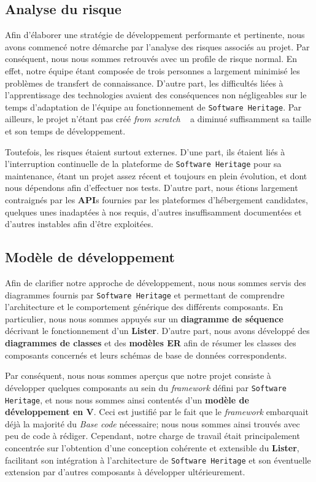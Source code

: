 \documentclass[12pt,a4paper]{report}
\begin{document}
\subsection{Analyse du risque}
Afin d'élaborer une stratégie de développement performante et pertinente, nous avons commencé notre démarche par l'analyse des risques associés au projet. Par conséquent, nous nous sommes retrouvés avec un profile de risque normal. En effet, notre équipe étant composée de trois personnes a largement minimisé les problèmes de transfert de connaissance. D'autre part, les difficultés liées à l'apprentissage des technologies avaient des conséquences non négligeables sur le temps d'adaptation de l'équipe au fonctionnement de \texttt{Software Heritage}.
Par ailleurs, le projet n'étant pas créé \og \textit{from scratch} \fg~ a diminué suffisamment sa taille et son temps de développement.

Toutefois, les risques étaient surtout externes. D'une part, ils étaient liés à l'interruption continuelle de la plateforme de \texttt{Software Heritage} pour sa maintenance, étant un projet assez récent et toujours en plein évolution, et dont nous dépendons afin d'effectuer nos tests. D'autre part, nous étions largement contraignés par les \textbf{API}s fournies par les plateformes d'hébergement candidates, quelques unes inadaptées à nos requis, d'autres insuffisamment documentées et d'autres instables afin d'être exploitées.

\subsection{Modèle de développement}
Afin de clarifier notre approche de développement, nous nous sommes servis des diagrammes fournis par \texttt{Software Heritage} et permettant de comprendre l'architecture et le comportement générique des différents composants. En particulier, nous nous sommes appuyés sur un \textbf{diagramme de séquence} décrivant le fonctionnement d'un \textbf{Lister}. D'autre part, nous avons développé des \textbf{diagrammes de classes} et des \textbf{modèles ER} afin de résumer les classes des composants concernés et leurs schémas de base de données correspondents.

Par conséquent, nous nous sommes aperçus que notre projet consiste à développer quelques composants au sein du \textit{framework} défini par \texttt{Software Heritage}, et nous nous sommes ainsi contentés d'un \textbf{modèle de développement en V}. Ceci est justifié par le fait que le \textit{framework} embarquait déjà la majorité du \textit{Base code} nécessaire; nous nous sommes ainsi trouvés avec peu de code à rédiger. Cependant, notre charge de travail était principalement concentrée sur l'obtention d'une conception cohérente et extensible du \textbf{Lister}, facilitant son intégration à l'architecture de \texttt{Software Heritage} et son éventuelle extension par d'autres composants à développer ultérieurement.
\end{document}

